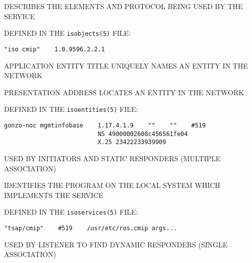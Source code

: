 \begin{bwslide}

\begin{nrtc}
\item	DESCRIBES THE ELEMENTS AND PROTOCOL BEING USED BY THE SERVICE

\item	DEFINED IN THE \verb"isobjects(5)" FILE:
\begin{verbatim}
"iso cmip"    1.0.9596.2.2.1
\end{verbatim}
\end{nrtc}
\end{bwslide}


\begin{bwslide}

\begin{nrtc}
\item	APPLICATION ENTITY TITLE UNIQUELY NAMES AN ENTITY IN THE NETWORK

\item	PRESENTATION ADDRESS LOCATES AN ENTITY IN THE NETWORK

\item	DEFINED IN THE \verb"isoentities(5)" FILE:
\begin{verbatim}
gonzo-noc mgmtinfobase    1.17.4.1.9    ""    ""    #519
                          NS 49000002608c456561fe04
                          X.25 23422233939909
\end{verbatim}

\item	USED BY INITIATORS AND STATIC RESPONDERS (MULTIPLE ASSOCIATION)
\end{nrtc}
\end{bwslide}


\begin{bwslide}

\begin{nrtc}
\item	IDENTIFIES THE PROGRAM ON THE LOCAL SYSTEM WHICH IMPLEMENTS THE SERVICE

\item	DEFINED IN THE \verb"isoservices(5)" FILE:
\begin{verbatim}
"tsap/cmip"    #519    /usr/etc/ros.cmip args...
\end{verbatim}

\item	USED BY LISTENER TO FIND DYNAMIC RESPONDERS (SINGLE ASSOCIATION)
\end{nrtc}
\end{bwslide}



